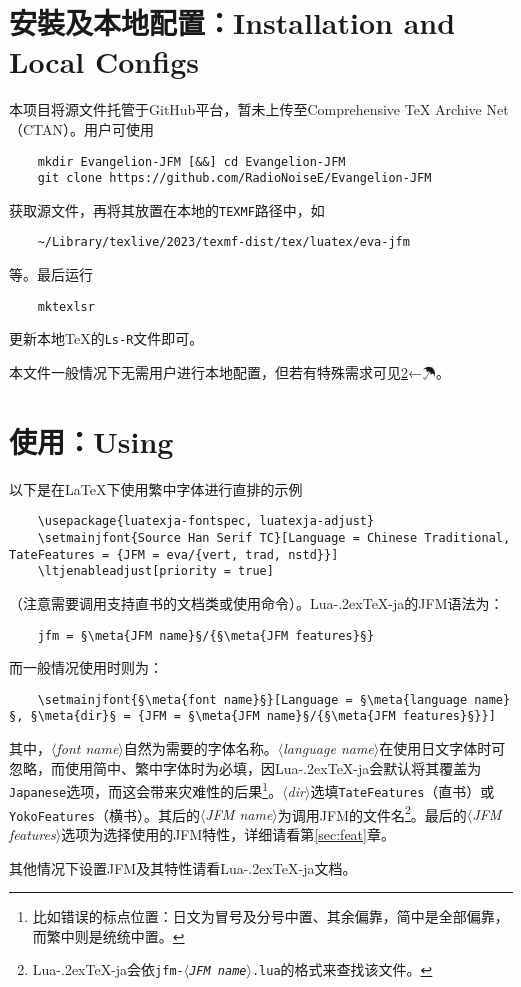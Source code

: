 \documentclass{ltjsarticle}
\def\meta#1{{\normalfont\rmfamily\itshape$\langle$#1\/$\rangle$}}
\def\段{\par}
\def\LuaTeX{Lua\kern-.2ex\TeX}
\begin{document}
\section{安裝及本地配置：Installation and Local Configs}
本项目将源文件托管于GitHub平台，暂未上传至Comprehensive \TeX{} Archive Net（CTAN）。用户可使用
\begin{lstlisting}
    mkdir Evangelion-JFM [&&] cd Evangelion-JFM
    git clone https://github.com/RadioNoiseE/Evangelion-JFM
\end{lstlisting}
获取源文件，再将其放置在本地的\texttt{TEXMF}路径中，如
\begin{lstlisting}
    ~/Library/texlive/2023/texmf-dist/tex/luatex/eva-jfm
\end{lstlisting}
等。最后运行
\begin{lstlisting}
    mktexlsr
\end{lstlisting}
更新本地\TeX{}的\texttt{Ls-R}文件即可。\段
本文件一般情况下无需用户进行本地配置，但若有特殊需求可见\ref{}←☂。

\section{使用：Using}
以下是在\LaTeX{}下使用繁中字体进行直排的示例
\begin{lstlisting}
    \usepackage{luatexja-fontspec, luatexja-adjust}
    \setmainjfont{Source Han Serif TC}[Language = Chinese Traditional, TateFeatures = {JFM = eva/{vert, trad, nstd}}]
    \ltjenableadjust[priority = true]
\end{lstlisting}
（注意需要调用支持直书的文档类或使用\texttt{\string\tate}命令）。\LuaTeX-ja的JFM语法为：
\begin{lstlisting}
    jfm = §\meta{JFM name}§/{§\meta{JFM features}§}
\end{lstlisting}
而一般情况使用\texttt{\string\setmainjfont}时则为：
\begin{lstlisting}
    \setmainjfont{§\meta{font name}§}[Language = §\meta{language name}§, §\meta{dir}§ = {JFM = §\meta{JFM name}§/{§\meta{JFM features}§}}]
\end{lstlisting}
其中，\meta{font name}自然为需要的字体名称。\meta{language name}在使用日文字体时可忽略，而使用简中、繁中字体时为必填，因\LuaTeX-ja会默认将其覆盖为\texttt{Japanese}选项，而这会带来灾难性的后果\footnote{比如错误的标点位置：日文为冒号及分号中置、其余偏靠，简中是全部偏靠，而繁中则是统统中置。}。\meta{dir}选填\texttt{TateFeatures}（直书）或\texttt{YokoFeatures}（横书）。其后的\meta{JFM name}为调用JFM的文件名\footnote{\LuaTeX-ja会依\texttt{jfm-\meta{JFM name}.lua}的格式来查找该文件。}。最后的\meta{JFM features}选项为选择使用的JFM特性，详细请看第\ref{sec:feat}章。\段
其他情况下设置JFM及其特性请看\LuaTeX-ja文档\cite{luatexja-doc}。
\end{document}
